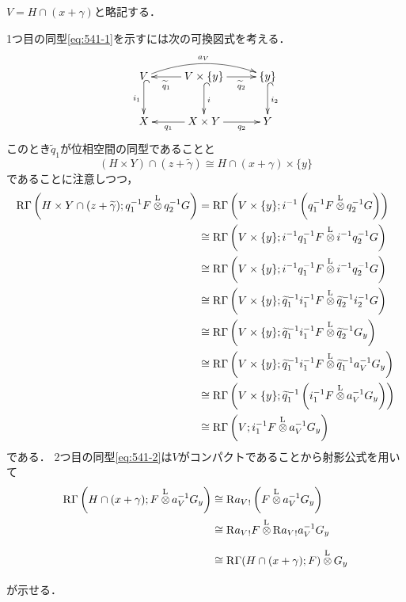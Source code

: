 \begin{CMT}
    \(V=H\cap (x+\gamma)\)と略記する．

    1つ目の同型\eqref{eq:541-1}を示すには次の可換図式を考える．
    \[\vcenter{\xymatrix@C=26pt@R=26pt{
        V
        \ar@{^{(}->}[d]_-{i_{1}}
        \ar@/^1pc/[rr]^-{a_{V}}
        &
        V\times\{y\}
        \ar[l]^-{\widetilde{q}_{1}}
        \ar[r]_-{\widetilde{q}_{2}}
        \ar@{^{(}->}[d]^-{i}
        &
        \{y\}%
        \ar@{^{(}->}[d]^-{i_{2}}
        \\
        X
        &
        X\times Y
        \ar[l]^-{q_{1}}
        \ar[r]_-{q_{2}}
        &
        Y
    }}\]
    このとき\(\widetilde{q}_{1}\)が位相空間の同型であることと\[
        (H\times Y)\cap (z+\widetilde{\gamma})
        \cong
        H\cap (x+\gamma)\times\{y\}
    \]であることに注意しつつ，
    \begin{align*}
        \RG\left(
            H\times Y\cap (z+\widetilde{\gamma});
            q_{1}^{-1}F\lltens[]q_{2}^{-1}G
        \right)
        &=
        \RG\left(
            V\times\{y\};
            i^{-1}\left(q_{1}^{-1}F\lltens[]q_{2}^{-1}G\right)
        \right)\\
        &\cong
        \RG\left(
            V\times\{y\};
            i^{-1}q_{1}^{-1}F\lltens[]i^{-1}q_{2}^{-1}G
        \right)\\
        &\cong
        \RG\left(
            V\times\{y\};
            i^{-1}q_{1}^{-1}F\lltens[]i^{-1}q_{2}^{-1}G
        \right)\\
        &\cong
        \RG\left(
            V\times\{y\};
            \widetilde{q}_{1}^{-1}i_{1}^{-1}F\lltens[]\widetilde{q}_{2}^{-1}i_{2}^{-1}G
        \right)\\
        &\cong
        \RG\left(
            V\times\{y\};
            \widetilde{q}_{1}^{-1}i_{1}^{-1}F
            \lltens[]
            \widetilde{q}_{2}^{-1}G_{y}
        \right)\\
        &\cong
        \RG\left(
            V\times\{y\};
            \widetilde{q}_{1}^{-1}i_{1}^{-1}F
            \lltens[]
            \widetilde{q}_{1}^{-1}a_{V}^{-1}G_{y}
        \right)\\
        &\cong
        \RG\left(
            V\times\{y\};
            {\widetilde{q}_{1}}^{-1}\left(i_{1}^{-1}F
            \lltens[]
            a_{V}^{-1}G_{y}\right)
        \right)\\
        &\cong
        \RG\left(
            V;
            i_{1}^{-1}F\lltens[]a_{V}^{-1}G_{y}
        \right)
    \end{align*}
    である．
    2つ目の同型\eqref{eq:541-2}は\(V\)がコンパクトであることから射影公式を用いて
    \begin{align*}
        \RG\left(H\cap (x+\gamma);F\lltens[]a_{V}^{-1}G_{y}\right)
        &\cong
        \Rder{a_{V}}_{!}\left(F\lltens[]a_{V}^{-1}G_{y}\right)\\
        &\cong
        \Rder{a_{V}}_{!}F\lltens[]\Rder{a_{V}}_{!}a_{V}^{-1}G_{y}\\
        &\cong
        \RG(H\cap (x+\gamma);F)\lltens[]G_{y}
    \end{align*}
    が示せる．
\end{CMT}
